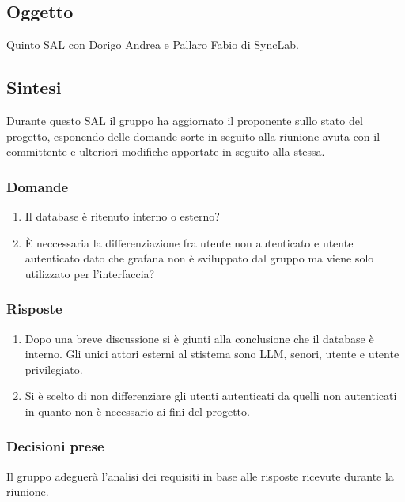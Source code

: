 \documentclass[10pt]{article}
\begin{document}
\subsection{Oggetto}
Quinto SAL con Dorigo Andrea e Pallaro Fabio di SyncLab.

\subsection{Sintesi}
Durante questo SAL il gruppo ha aggiornato il proponente sullo stato del progetto, esponendo delle domande sorte in seguito alla riunione avuta con il committente e ulteriori modifiche apportate in seguito alla stessa.

\subsubsection{Domande}
\begin{enumerate}
  \item Il database è ritenuto interno o esterno?
  \item È neccessaria la differenziazione fra utente non autenticato e utente autenticato dato che grafana non è sviluppato dal gruppo ma viene solo utilizzato per l'interfaccia?
\end{enumerate}

\subsubsection{Risposte}
\begin{enumerate}
  \item Dopo una breve discussione si è giunti alla conclusione che il database è interno. Gli unici attori esterni al stistema sono LLM, senori, utente e utente privilegiato.
  \item Si è scelto di non differenziare gli utenti autenticati da quelli non autenticati in quanto non è necessario ai fini del progetto.
\end{enumerate}

\subsubsection{Decisioni prese}
Il gruppo adeguerà l'analisi dei requisiti in base alle risposte ricevute durante la riunione.
\end{document}
